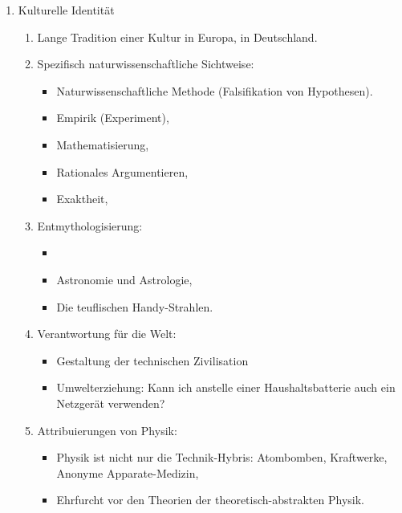 \begin{enumerate}
	\item Kulturelle Identit\"{a}t

	\begin{enumerate}

		\item Lange Tradition einer Kultur in Europa, in Deutschland.

		\item Spezifisch naturwissenschaftliche Sichtweise:
		\begin{itemize}
			\item Naturwissenschaftliche Methode (Falsifikation von Hypothesen).
			\item Empirik (Experiment),
			\item Mathematisierung,
			\item Rationales Argumentieren,
			\item Exaktheit,
		\end{itemize}

		\item Entmythologisierung:
		\begin{itemize}
			\item {}
			\item Astronomie und Astrologie,
			\item Die teuflischen Handy-Strahlen.
		\end{itemize}

		\item Verantwortung f\"{u}r die Welt:
		\begin{itemize}
			\item Gestaltung der technischen Zivilisation
			\item Umwelterziehung: Kann ich anstelle einer Haushaltsbatterie auch ein Netzger\"{a}t verwenden?

		\end{itemize}


		\item Attribuierungen von Physik:
		\begin{itemize}
			\item Physik ist nicht nur die Technik-Hybris: Atombomben, Kraftwerke, Anonyme Apparate-Medizin,
			\item Ehrfurcht vor den Theorien der theoretisch-abstrakten Physik.
		\end{itemize}

	\end{enumerate}


\end{enumerate}
